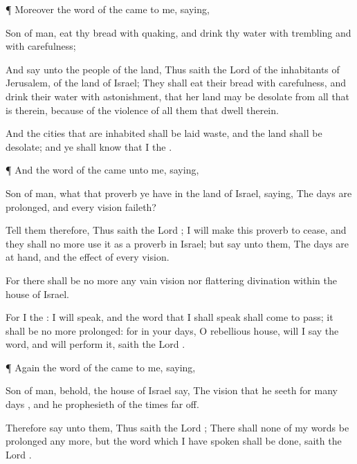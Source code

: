 {\par }{\PP {}¶ Moreover the
word of the
{} came to me,
saying,

Son of
man,
eat thy
bread with
quaking, and
drink thy
water with
trembling and with
carefulness;

And
say unto the
people of the
land, Thus
saith the
Lord
{} of the
inhabitants of
Jerusalem,
{} of the
land of
Israel; They shall
eat their
bread with
carefulness, and
drink their
water with
astonishment, that her
land may be
desolate from all that is
therein, because of the
violence of all them that
dwell therein.

And the
cities that are
inhabited shall be laid
waste, and the
land shall be
desolate; and ye shall
know that I
{} the
{}.


\par }{\PP {}¶ And the
word of the
{} came unto me,
saying,

Son of
man, what
{} that
proverb
{} ye have in the
land of
Israel,
saying, The
days are
prolonged, and every
vision
faileth?

Tell them therefore, Thus
saith the
Lord
{}; I will make this
proverb to
cease, and they shall no more use it as a
proverb in
Israel; but
say unto them, The
days are at
hand, and the
effect of every
vision.

For there shall be no more any
vain
vision nor
flattering
divination
within the
house of
Israel.

For I
{} the
{}: I will
speak, and the
word that I shall
speak shall come to
pass; it shall be no more
prolonged: for in your
days, O
rebellious
house, will I
say the
word, and will
perform it,
saith the
Lord
{}.


\par }{\PP {}¶ Again the
word of the
{} came to me,
saying,

Son of
man, behold,
{} the
house of
Israel
say, The
vision that he
seeth
{} for
many
days
{}, and he
prophesieth of the
times
{}
far off.

Therefore
say unto them, Thus
saith the
Lord
{}; There shall none of my
words be
prolonged any more, but the
word which I have
spoken shall be
done,
saith the
Lord
{}.




}
